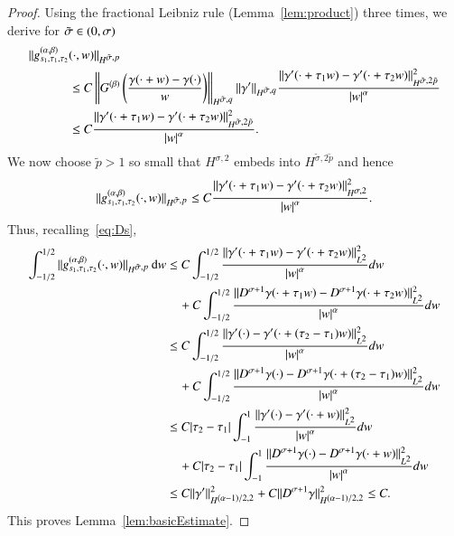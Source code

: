 \begin{proof}
Using the fractional Leibniz rule (Lemma~\ref{lem:product}) three times, we derive for $\tilde\s\in(0,\s)$
\begin{align*}
  \|g^{(\a,\beta)}_{s_1, \tau_1, \tau_2}&(\cdot,w)\|_{\W[\tilde \sigma,p]} \\
 &\leq C 
 \left\|G^{(\beta)}\left(\frac {\gamma(\cdot +w)-\gamma(\cdot)}{w}\right) \right\|_{\W[ \tilde \sigma,q]}
 \|\gamma'\|_{\W[\tilde \sigma,q]}
\frac{\|\gamma'(\cdot + \tau_1 w) - \gamma'(\cdot + \tau_2 w )\|^2_{\W[\tilde\sigma,2\tilde p]}}{\abs w^\a}
 \\
 &\leq C \frac{\|\gamma'(\cdot + \tau_1 w) - \gamma'(\cdot + \tau_2 w )\|^2_{\W[\tilde\sigma,2\tilde p]}}{\abs w^\a}.
\end{align*}
We now choose $\tilde p>1$ so small that $H^{\sigma ,2}$ embeds into $H^{\tilde \sigma, 2 \tilde p}$
and hence
\begin{equation*}
 \|g^{(\a,\beta)}_{s_1, \tau_1, \tau_2}(\cdot, w)\|_{\W[\tilde \sigma,p]} 
  \leq  C \frac{\|\gamma'(\cdot + \tau_1 w) - \gamma'(\cdot + \tau_2 w )\|^2_{\W[\sigma,2]}}{\abs w^\a}.
\end{equation*}
Thus, recalling~\eqref{eq:Ds},
\begin{align*}
  \int_{-1/2}^{1/2}\|g^{(\a,\beta)}_{s_1, \tau_1, \tau_2}(\cdot,w)\|_{\W[\tilde \sigma,p]} \d w&\leq C
  \int_{-1/2}^{1/2} \frac{\|\gamma'(\cdot + \tau_1 w) - \gamma'(\cdot + \tau_2 w )\|^2_{\Lp[2]} }{\abs w^\alpha} dw
  \\
  & \quad + C
  \int_{-1/2}^{1/2} \frac {\|D^{\sigma+1}\gamma(\cdot + \tau_1 w) - D^{\sigma+1}\gamma(\cdot + \tau_2 w )\|^2_{\Lp[2]} 
   }{\abs w^\alpha} dw
  \\
&\leq C
\int_{-1/2}^{1/2} \frac{\|\gamma'(\cdot) - \gamma'(\cdot + (\tau_2 - \tau_1) w )\|^2_{\Lp[2]} }{\abs w^\alpha} dw
 \\
& \quad + C
  \int_{-1/2}^{1/2} \frac {\|D^{\sigma+1}\gamma(\cdot) 
- D^{\sigma+1} \gamma(\cdot + (\tau_2 - \tau_1) w )\|^2_{\Lp[2]} }{\abs w^\alpha} dw
\\
&\leq C |\tau_2 - \tau_1|
\int_{-1}^{1} \frac{\|\gamma'(\cdot) - \gamma'(\cdot +  w )\|^2_{\Lp[2]} }{\abs w^\alpha} dw
 \\
& \quad + C |\tau_2-\tau_1|
  \int_{-1}^{1} \frac {\|D^{\sigma+1}\gamma(\cdot) - D^{\sigma+1} \gamma(\cdot +  w )\|^2_{\Lp[2]} }{\abs w^\alpha} dw
\\
& \leq C \|\gamma'\|_{\W[(\a-1)/2,2]}^2 
 + C \|D^{\sigma+1}\gamma\|_{\W[(\a-1)/2,2]}^2 \leq C.
\end{align*}
This proves Lemma~\ref{lem:basicEstimate}.
\end{proof}


